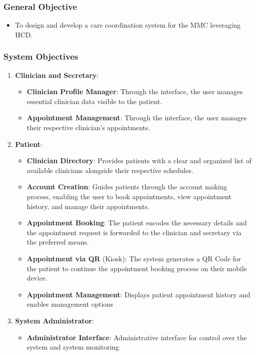 \documentclass[11pt,a4paper,titlepage]{article}
\begin{document}
	\subsubsection{General Objective}
	\begin{itemize} 
		\item To design and develop a care coordination system for the MMC leveraging HCD. 
	\end{itemize}
	\subsubsection{System Objectives}
	\begin{enumerate}
		\item \textbf{Clinician and Secretary}:
		\begin{itemize}
			\item \textbf{Clinician Profile Manager}: Through the interface, the user manages essential clinician data visible to the patient. 
			\item \textbf{Appointment Management}: Through the interface, the user manages their respective clinician's appointments. 
		\end{itemize}
		\item \textbf{Patient}:
		\begin{itemize}
			\item \textbf{Clinician Directory}: Provides patients with a clear and organized list of available clinicians alongside their respective schedules. 
			\item \textbf{Account Creation}: Guides patients through the account making process, enabling the user to book appointments, view appointment history, and manage their appointments.
			\item \textbf{Appointment Booking}: The patient encodes the necessary details and the appointment request is forwarded to the clinician and secretary via the preferred means. 
			\item \textbf{Appointment via QR}  (Kiosk): The system generates a QR Code for the patient to continue the appointment booking process on their mobile device.
			\item \textbf{Appointment Management}: Displays patient appointment history and enables management options
		\end{itemize}
		\item \textbf{System Administrator}:
		\begin{itemize}
			\item \textbf{Administrator Interface}: Administrative interface for control over the system and system monitoring
		\end{itemize}
	\end{enumerate}
\end{document}
